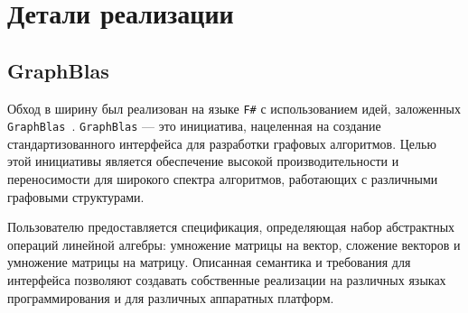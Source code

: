 
\section{Детали реализации}
\subsection{GraphBlas}
Обход в ширину был реализован на языке \texttt{F\#} с использованием идей, заложенных \texttt{GraphBlas}~\cite{graphBlas}.
\texttt{GraphBlas} --- это инициатива, нацеленная на создание стандартизованного интерфейса для разработки графовых алгоритмов.
Целью этой инициативы является обеспечение высокой производительности и переносимости для широкого спектра алгоритмов, работающих с различными графовыми структурами.

Пользователю предоставляется спецификация, определяющая набор абстрактных операций линейной алгебры: умножение матрицы на вектор, сложение векторов и умножение матрицы на матрицу. Описанная семантика и требования для интерфейса позволяют создавать собственные реализации на различных языках программирования и для различных аппаратных платформ. 

